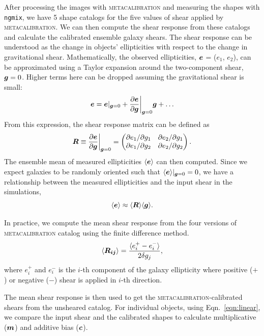 \documentclass[fleqn,usenatbib]{mnras}
\begin{document}
After processing the images with \textsc{metacalibration} and measuring the shapes with \texttt{ngmix}, we have 5 shape catalogs for the five values of shear applied by \textsc{metacalibration}. We can then compute the shear response from these catalogs and calculate the calibrated ensemble galaxy shears. The shear response can be understood as the change in objects' ellipticities with respect to the change in gravitational shear. Mathematically, the observed ellipticities, $\vb*{e}$ = ($e_{1}$, $e_{2}$), can be approximated using a Taylor expansion around the two-component shear, $\vb*{g}=0$. Higher terms here can be dropped assuming the gravitational shear is small: 
\begin{equation}
    \vb*{e} = \vb*{e}\rvert_{\vb*{g}=0} + \frac{\partial \vb*{e}}{\partial \vb*{g}}\bigg\rvert_{\vb*{g}=0}\vb*{g} + \ldots
\end{equation}
From this expression, the shear response matrix can be defined as 
\begin{equation}
    \vb*{R} \equiv \frac{\partial \vb*{e}}{\partial \vb*{g}}\bigg\rvert_{\vb*{g}=0} = 
    \begin{pmatrix}
        \partial e_{1}/\partial g_{1} & \partial e_{2}/\partial g_{1} \\ 
        \partial e_{1}/\partial g_{2} & \partial e_{2}/\partial g_{2}
    \end{pmatrix}. 
\end{equation}
The ensemble mean of measured ellipticities $\langle\vb*{e}\rangle$ can then computed. Since we expect galaxies to be randomly oriented such that $\langle\vb*{e}\rangle\rvert_{\vb*{g}=0}=0$, we have a relationship between the measured ellipticities and the input shear in the simulations, 
\begin{equation}
    \langle\vb*{e}\rangle \approx \langle \vb*{R}\rangle\langle\vb*{g} \rangle. 
\end{equation} 


In practice, we compute the mean shear response from the four versions of \textsc{metacalibration} catalog using the finite difference method. 
\begin{equation}
    \langle\vb*{R_{ij}}\rangle = 
    \frac{\langle e^{+}_{i} - e^{-}_{i} \rangle}{2\delta g_{j}}, 
\end{equation}
where $e^{+}_{i}$ and $e^{-}_{i}$ is the $i$-th component of the galaxy ellipticity where positive ($+$) or negative ($-$) shear is applied in $i$-th direction. 

The mean shear response is then used to get the \textsc{metacalibration}-calibrated shears from the unsheared catalog. For individual objects, using Eqn.~\eqref{eqn:linear}, we compare the input shear and the calibrated shapes to calculate multiplicative ($\vb*{m}$) and additive bias ($\vb*{c}$).
\end{document}
